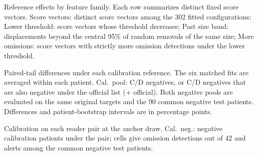 \begin{table}[!t]
\centering\small
\caption{Reference effects by feature family. Each row summarizes distinct fixed score vectors. Score vectors: distinct score vectors among the 302 fitted configurations; Lower threshold: score vectors whose threshold decreases; Past size band: displacements beyond the central 95\% of random removals of the same size; More omissions: score vectors with strictly more omission detections under the lower threshold.}
\label{tab:families}

\end{table}

\begin{table}[!t]
\centering\small
\caption{Paired-tail differences under each calibration reference. The six matched fits are averaged within each patient. Cal.\ pool: C/D negatives, or C/D negatives that are also negative under the official list (+ official). Both negative pools are evaluated on the same original targets and the 90 common negative test patients. Differences and patient-bootstrap intervals are in percentage points.}
\label{tab:alt}

\end{table}

\begin{table}[t]
\centering\small
\caption{Calibration on each reader pair at the anchor draw. Cal.\ neg.: negative calibration patients under the pair; cells give omission detections out of 42 and alerts among the \RoleTest{} common negative test patients.}
\label{tab:roles}

\end{table}

